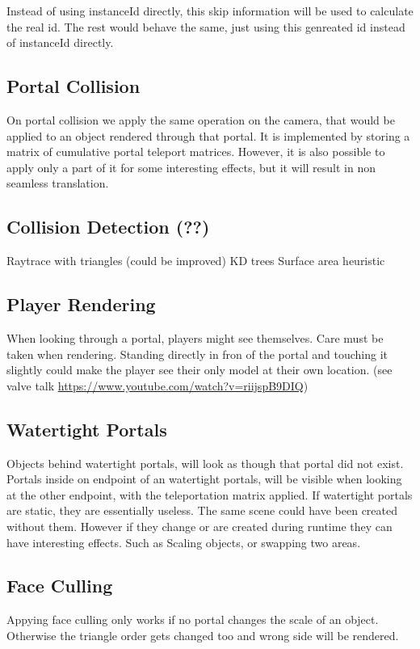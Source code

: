 Instead of using instanceId directly, this skip information will be used to calculate the real id. The rest would behave the same, just using this genreated id instead of instanceId directly.


\subsection{Portal Collision}
On portal collision we apply the same operation on the camera, that would be applied to an object rendered through that portal.
It is implemented by storing a matrix of cumulative portal teleport matrices.
However, it is also possible to apply only a part of it for some interesting effects, but it will result in non seamless translation.

\subsection{Collision Detection (??)}
Raytrace with triangles (could be improved)
KD trees
Surface area heuristic

\subsection{Player Rendering}
When looking through a portal, players might see themselves. Care must be taken when rendering. Standing directly in fron of the portal and touching it slightly could make the player see their only model at their own location. (see valve talk \url{https://www.youtube.com/watch?v=riijspB9DIQ})

\subsection{Watertight Portals}
Objects behind watertight portals, will look as though that portal did not exist. Portals inside on endpoint of an watertight portals, will be visible when looking at the other endpoint, with the teleportation matrix applied. If watertight portals are static, they are essentially useless. The same scene could have been created without them.
However if they change or are created during runtime they can have interesting effects. Such as Scaling objects, or swapping two areas.

\subsection{Face Culling}
Appying face culling only works if no portal changes the scale of an object. Otherwise the triangle order gets changed too and wrong side will be rendered.

